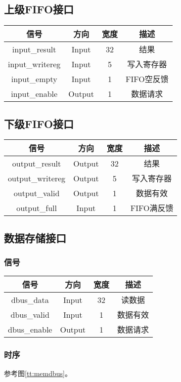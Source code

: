 \documentclass{article}
\newenvironment{signals}{
	\begin{center}
		\begin{tabular}{| c | c | c | c |}
			\hline
			信号 & 方向 & 宽度 & 描述 \\ \hline
}{
		\end{tabular}
	\end{center}
}
\newcommand\sigin{Input}
\newcommand\sigout{Output}
\begin{document}
\subsection{上级FIFO接口}

\begin{signals}
	input\_result & \sigin & 32 & 结果 \\ \hline
	input\_writereg & \sigin & 5 & 写入寄存器 \\ \hline
	input\_empty & \sigin & 1 & FIFO空反馈 \\ \hline
	input\_enable & \sigout & 1 & 数据请求 \\ \hline
\end{signals}

\subsection{下级FIFO接口}

\begin{signals}
	output\_result & \sigout & 32 & 结果 \\ \hline
	output\_writereg & \sigout & 5 & 写入寄存器 \\ \hline
	output\_valid & \sigout & 1 & 数据有效 \\ \hline
	output\_full & \sigin & 1 & FIFO满反馈 \\ \hline
\end{signals}

\subsection{数据存储接口}

\subsubsection{信号}

\begin{signals}
	dbus\_data & \sigin & 32 & 读数据 \\ \hline
	dbus\_valid & \sigin & 1 & 数据有效 \\ \hline
	dbus\_enable & \sigout & 1 & 数据请求 \\ \hline
\end{signals}

\subsubsection{时序}

参考图\ref{tt:memdbus}。
\end{document}
